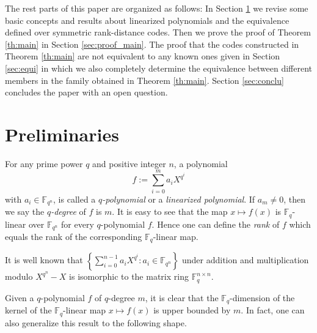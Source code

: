 \documentclass{amsart}
\theoremstyle{plain}
\theoremstyle{definition}
\newcommand{\F}{\mathbb F}
\newcommand{\fqn}{\mathbb{F}_{q^n}}
\begin{document}
	The rest parts of this paper are organized as follows: In Section \ref{sec:pre} we revise some basic concepts and results about linearized polynomials and the equivalence defined over symmetric rank-distance codes. Then we prove the proof of Theorem \ref{th:main} in Section \ref{sec:proof_main}. The proof that the codes constructed in Theorem \ref{th:main} are not equivalent to any known ones given in Section \ref{sec:equi} in which we also completely determine the equivalence between different members in the family obtained in Theorem \ref{th:main}. Section \ref{sec:conclu} concludes the paper with an open question.
	
	\section{Preliminaries}\label{sec:pre}
	
	For any prime power $q$ and positive integer $n$, a polynomial
	\[
	f:= \sum_{i=0}^m a_i X^{q^i}
	\]
	with $a_i\in \fqn$,
	is called a \emph{$q$-polynomial} or a \emph{linearized polynomial}. If $a_m\neq 0$, then we say the \emph{$q$-degree} of $f$ is $m$.
	It is easy to see that the map $x\mapsto f(x)$ is $\F_q$-linear over $\F_{q^n}$ for every $q$-polynomial $f$. Hence one can define the \emph{rank} of $f$ which equals the rank of the corresponding $\F_q$-linear map.
	
	It is well known that $\left\{ \sum_{i=0}^{n-1} a_i X^{q^i}: a_i\in \fqn \right\}$ under addition and multiplication modulo $X^{q^n}-X$ is isomorphic to the matrix ring $\F_q^{n\times n}$.
	
	Given a $q$-polynomial $f$ of $q$-degree $m$, it is clear that the $\F_q$-dimension of the kernel of the $\F_q$-linear map $x\mapsto f(x)$ is upper bounded by $m$. In fact, one can also generalize this result to the following shape.
	
\end{document}
